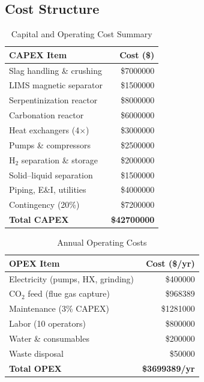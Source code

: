 \documentclass[11pt,a4paper]{article}
\begin{document}
\subsection{Cost Structure}

\begin{table}[H]
\centering
\caption{Capital and Operating Cost Summary}
\label{tab:costs}
\begin{tabular}{@{}lr@{}}
\toprule
\textbf{CAPEX Item} & \textbf{Cost (\$)} \\
\midrule
Slag handling \& crushing  & \$\num{7000000} \\
LIMS magnetic separator    & \$\num{1500000} \\
Serpentinization reactor   & \$\num{8000000} \\
Carbonation reactor        & \$\num{6000000} \\
Heat exchangers (4$\times$)& \$\num{3000000} \\
Pumps \& compressors       & \$\num{2500000} \\
H$_2$ separation \& storage& \$\num{2000000} \\
Solid--liquid separation   & \$\num{1500000} \\
Piping, E\&I, utilities    & \$\num{4000000} \\
Contingency (20\%)         & \$\num{7200000} \\
\midrule
\textbf{Total CAPEX} & \textbf{\$\num{42700000}} \\
\bottomrule
\end{tabular}
\end{table}

\begin{table}[H]
\centering
\caption{Annual Operating Costs}
\label{tab:opex}
\begin{tabular}{@{}lr@{}}
\toprule
\textbf{OPEX Item} & \textbf{Cost (\$/yr)} \\
\midrule
Electricity (pumps, HX, grinding)  & \$\num{400000} \\
CO$_2$ feed (flue gas capture)     & \$\num{968389} \\
Maintenance (3\% CAPEX)            & \$\num{1281000} \\
Labor (10 operators)               & \$\num{800000} \\
Water \& consumables               & \$\num{200000} \\
Waste disposal                     & \$\num{50000} \\
\midrule
\textbf{Total OPEX} & \textbf{\$\num{3699389}/yr} \\
\bottomrule
\end{tabular}
\end{table}
\end{document}
